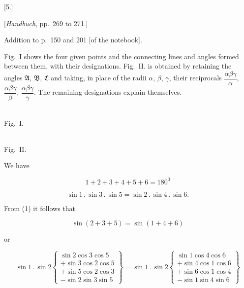 
\begin{center}
[5.]

[\emph{Handbuch}, pp.\ 269 to 271.]
\end{center}

\begin{center}Addition to p.\ 150 and 201 [of the notebook].\end{center}

Fig.\ I shows the four given points and the connecting lines and angles formed between them, with their designations. Fig.\ II. is obtained by retaining the angles $\mathfrak{A}$, $\mathfrak{B}$, $\mathfrak{C}$ and taking, in place of the radii $\alpha$, $\beta$, $\gamma$, their reciprocals $\dfrac{\alpha\beta\gamma}{\alpha}$, $\dfrac{\alpha\beta\gamma}{\beta}$, $\dfrac{\alpha\beta\gamma}{\gamma}$. The remaining designations explain themselves.

\begin{center}
\begin{minipage}[b]{5.5cm}\centering\\Fig.\ I.\end{minipage}\hspace{.3cm}%
\begin{minipage}[b]{6.6cm}\centering\\Fig.\ II.\end{minipage}
\end{center}

We have

\begin{equation}
1+2+3+4+5+6=180^0
\tag{1}
\end{equation}

\begin{equation}
\sin 1 \, . \, \sin 3 \, . \, \sin 5 = \sin 2 \, . \, \sin 4 \, . \, \sin 6.
\tag{2}
\end{equation}

From (1) it follows that

\[
\sin(2+3+5) = \sin(1+4+6)
\]

or

\[
\sin 1 \, . \, \sin 2 \left\{\begin{array}{l} \sin 2 \cos 3 \cos 5 \\ + \sin 3 \cos 2 \cos 5 \\ + \sin 5 \cos 2 \cos 3 \\ - \sin 2 \sin 3 \sin 5 \end{array}\right\}
= \sin 1 \, . \, \sin 2 \left\{\begin{array}{l} \sin 1 \cos 4 \cos 6 \\ + \sin 4 \cos 1 \cos 6 \\ + \sin 6 \cos 1 \cos 4 \\ - \sin 1 \sin 4 \sin 6 \end{array}\right\}
\]

